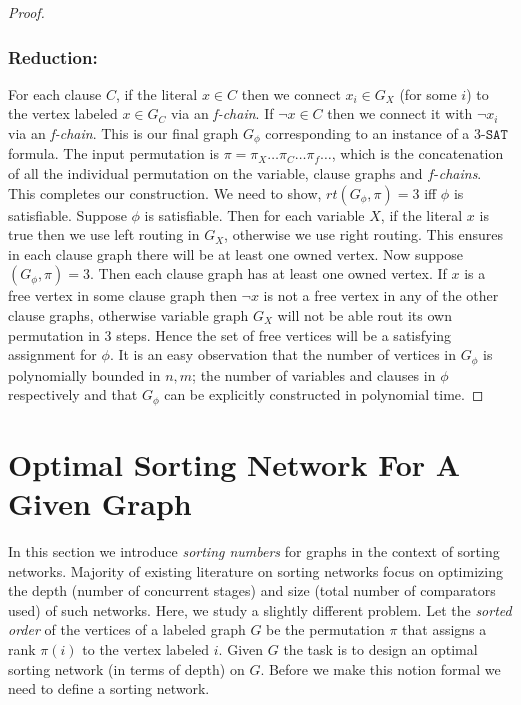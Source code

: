 \documentclass[runningheads,a4paper]{llncs}
\begin{document}
\begin{proof}
	\subsubsection{Reduction:} For each clause $C$, if the literal $x \in C$  then we connect $x_i \in G_X$  (for some $i$) to the vertex labeled $x \in G_C$ via an \textit{f-chain}. If $\neg x \in C$ then we connect it with $\neg x_i$ via an \textit{f-chain}. This is our final graph $G_{\phi}$ corresponding to an instance of a 3-$ \mathtt{SAT} $ formula. The input permutation is $\pi = \pi_X\ldots\pi_C\ldots\pi_f\ldots$, which is the concatenation of all the individual permutation on the variable, clause  graphs and $f$-\textit{chains}.  This completes our construction. We need to show, $rt(G_\phi,\pi) = 3$ iff $\phi$ is satisfiable. Suppose $\phi$ is satisfiable. Then for each variable $X$, if the literal $x$ is true then we use left routing in $G_X$, otherwise we use right routing. This ensures in each clause graph there will be at least one owned vertex.  Now suppose $(G_{\phi},\pi) = 3$. Then each clause graph has at least one owned vertex. If $x$ is a free vertex in some clause graph then $\neg x$ is not a free vertex in any of the other clause graphs, otherwise variable graph $G_X$ will not be able rout its own permutation in 3 steps. Hence the set of free vertices will be a satisfying assignment for $\phi$. It is an easy observation that the number of vertices in $G_\phi$ is polynomially bounded in $n,m$; the number of variables and clauses in $\phi$ respectively and that $G_\phi$ can be explicitly constructed in polynomial time.
	
	
\end{proof}



\section{Optimal Sorting Network For A Given Graph}
In this section we introduce {\it sorting numbers} for graphs in the context of  sorting networks. Majority of existing literature on sorting networks focus on optimizing the depth (number of concurrent stages) and size (total number of comparators used) of such networks. Here, we study a slightly different problem. Let the \textit{sorted order} of the vertices of a labeled graph $G$ be the permutation $\pi$ that assigns a rank $\pi(i)$ to the vertex labeled $i$.
Given $G$ the task is to design an optimal sorting network (in terms of depth) on $G$. Before we make this notion formal we need to define a sorting network.
\end{document}
